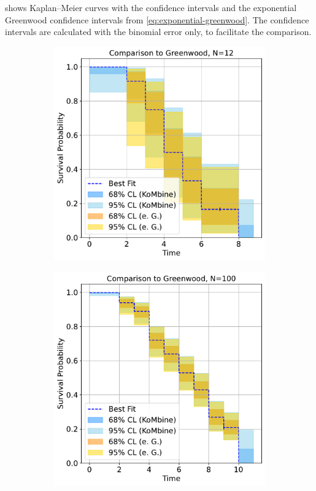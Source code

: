 \documentclass[article]{jss}
\newcommand{\KM}{Kaplan--Meier} %
\begin{document}
 shows \KM{} curves with the  confidence intervals and the exponential Greenwood confidence intervals from \cref{eq:exponential-greenwood}. The  confidence intervals are calculated with the binomial error only, to facilitate the comparison.

\begin{figure}
\centering
\begin{subfigure}[t]{0.49\textwidth}
  \centering
  \includegraphics[width=\linewidth]{comparison_to_greenwood_small_n.pdf}
  \caption{\label{fig:compare-to-greenwood-small-n}}
\end{subfigure}
\begin{subfigure}[t]{0.49\textwidth}
  \centering
  \includegraphics[width=\linewidth]{comparison_to_greenwood_large_n.pdf}

\end{subfigure}
\end{figure}
\end{document}
